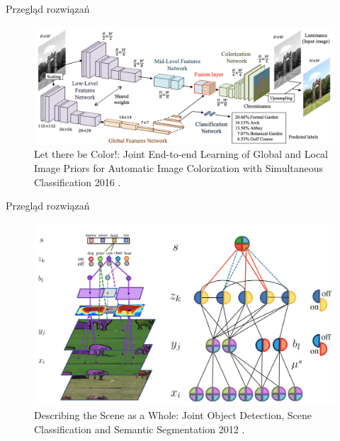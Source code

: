 \documentclass[10pt]{beamer}
\begin{document}
            \begin{frame}{Przegląd rozwiązań}
                
                \begin{figure}
                    \includegraphics[width=\textwidth]{images/global-local-features.png}
                    \caption{Let there be Color!: Joint End-to-end Learning of Global and Local Image Priors for Automatic Image Colorization with Simultaneous Classification 2016 \cite{iizuka2016let}.}
                \end{figure}
            \end{frame}
            \begin{frame}{Przegląd rozwiązań}
                
                \begin{figure}
                    \includegraphics[width=\textwidth]{images/joint-segmentation-and-classification.png}
                    \caption{Describing the Scene as a Whole: Joint Object Detection, Scene Classification and Semantic Segmentation 2012 \cite{yao2012describing}.}
                \end{figure}
            \end{frame}
\end{document}
